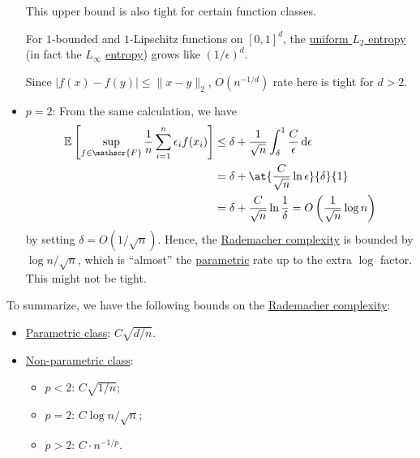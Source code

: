 \begin{itemize}
	      This upper bound is also tight for certain function classes.
	      \begin{eg}
		      For \(1\)-bounded and \(1\)-Lipschitz functions on \([0, 1]^d\), the \hyperref[def:Koltchinskii-Pollard-entropy]{uniform \(L_2\) entropy} (in fact the \(L_\infty \) \hyperref[def:metric-entropy]{entropy}) grows like \((1 / \epsilon )^d\).
	      \end{eg}
	      \begin{explanation}
		      Since \(\vert f(x) - f(y) \vert \leq \lVert x - y \rVert _2\), \(O(n^{-1 / d})\) rate here is tight for \(d > 2\).
	      \end{explanation}
	\item \(p = 2\): From the same calculation, we have
	      \begin{align*}
		      \mathbb{E}_{}\left[\sup _{f\in \mathscr{F} } \frac{1}{n}\sum_{i=1}^{n} \epsilon _i f(x_i) \right]
		       & \leq \delta + \frac{1}{\sqrt{n} } \int_{\delta }^{1} \frac{C}{\epsilon } \,\mathrm{d}\epsilon \\
		       & = \delta + \at{\frac{C}{\sqrt{n} } \ln \epsilon}{\delta }{1}                                  \\
		       & = \delta + \frac{C}{\sqrt{n} } \ln \frac{1}{\delta}
		      = O\left( \frac{1}{\sqrt{n} } \log n \right)
	      \end{align*}
	      by setting \(\delta = O(1 / \sqrt{n} )\). Hence, the \hyperref[def:Rademacher-complexity]{Rademacher complexity} is bounded by \(\log n / \sqrt{n} \), which is ``almost'' the \hyperref[def:parametric]{parametric} rate up to the extra \(\log \) factor. This might not be tight.
\end{itemize}

\begin{remark}
	To summarize, we have the following bounds on the \hyperref[def:Rademacher-complexity]{Rademacher complexity}:
	\begin{itemize}
		\item \hyperref[def:parametric]{Parametric class}: \(C \sqrt{d / n} \).
		\item \hyperref[def:non-parametric]{Non-parametric class}:
		      \begin{itemize}
			      \item \(p < 2\): \(C \sqrt{1 / n} \);
			      \item \(p = 2\): \(C \log n / \sqrt{n} \);
			      \item \(p > 2\): \(C \cdot n^{-1 / p}\).
		      \end{itemize}
	\end{itemize}
\end{remark}

